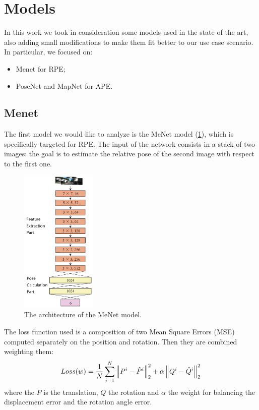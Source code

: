 \section{Models}
In this work we took in consideration some models used in the state of the art, also adding  small modifications to make them fit better to our use case scenario.
In particular, we focused on:
\begin{itemize}
    \item Menet for RPE;
    \item PoseNet and MapNet for APE.
\end{itemize}

\subsection{Menet}
The first model we would like to analyze is the MeNet model (\cref{fig:menet-structure}), which is specifically targeted for RPE.
The input of the network consists in a stack of two images: the goal is to estimate the relative pose of the second image with respect to the first one.
\begin{figure}
    \begin{center}
        \includegraphics[width=0.32\textwidth]{./imgs/menet_structure.png}
    \end{center}
    \caption{The architecture of the MeNet model.}
    \label{fig:menet-structure}
\end{figure}

The loss function used is a composition of two Mean Square Errors (MSE) computed separately on the position and rotation. Then they are combined weighting them:
\begin{equation}
    Loss(w) = \frac{1}{N} \sum\limits_{i=1}^N \norm{P^i - \hat{P}^i}^2_2 + \alpha\norm{Q^i - \hat{Q}^i}^2_2
    \label{eq:menet-loss}
\end{equation}
where the $P$ is the translation, $Q$ the rotation and $\alpha$ the weight for balancing the displacement error and the rotation angle error.

